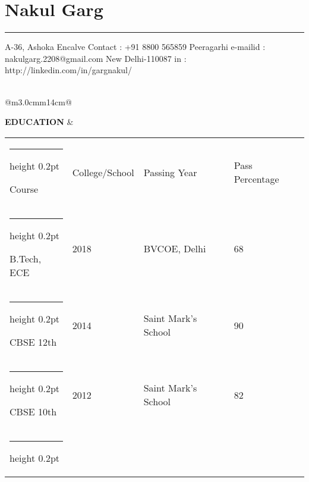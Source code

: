 \documentclass[a4paper]{article}
\author{Nakul Garg}
\makeatletter
\newcommand{\thinhline}
{
\noalign {\ifnum 0=`}\fi \hrule height 0.2pt
\futurelet \reserved@a \@xhline
}
\makeatother
\begin{document}
	
	\section*{\center\textbf\Huge Nakul Garg}
		\hrule
		
		\vspace{2mm}	
		A-36, Ashoka Encalve  \hfill {Contact : +91 8800 565859} \newline
		Peeragarhi \hfill {e-mailid : nakulgarg.2208@gmail.com} \newline
		New Delhi-110087 \hfill  {in : http://linkedin.com/in/gargnakul/} \\ \\
		
		\centering
		\begin{longtable}{@{}m{3.0cm}m{14cm}@{}}
			
			\textrm{\textbf {EDUCATION}} & 
				\begin{center}
					\begin{tabular}{ |m{4cm}| m{4cm}| m{2cm}| m{3cm}| }
						\thinhline
						{\begin{center} Course \end{center}} & {\begin{center} 
						College/School \end{center}} & {\begin{center} Passing Year \end{center}} 
						& {\begin{center} Pass Percentage \end{center}} \\
						\thinhline
    					B.Tech,  ECE & 2018 & BVCOE, Delhi  & 68\\ 
		    			\thinhline
    					CBSE 12th & {2014} & Saint Mark's School & 90\\
    					\thinhline
		    			CBSE 10th & 2012 & Saint Mark's School & 82\\
    					\thinhline
  					\end{tabular}
				\end{center}
			\\ \\
			
			\end{longtable}
\end{document}
